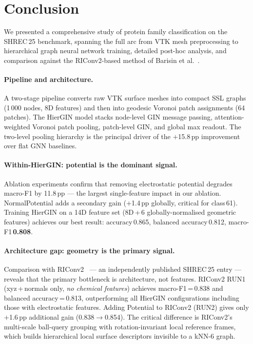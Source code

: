 \section{Conclusion}
\label{sec:conclusion}

We presented a comprehensive study of protein family classification on the
SHREC\,25 benchmark, spanning the full arc from VTK mesh preprocessing to
hierarchical graph neural network training, detailed post-hoc analysis, and
comparison against the RIConv2-based method of Barisin et al.~\cite{riconv2}.

\paragraph{Pipeline and architecture.}
A two-stage pipeline converts raw VTK surface meshes into compact SSL graphs
(1\,000 nodes, 8D features) and then into geodesic Voronoi patch assignments
(64 patches).
The HierGIN model stacks node-level GIN message passing, attention-weighted
Voronoi patch pooling, patch-level GIN, and global max readout.
The two-level pooling hierarchy is the principal driver of the $+$15.8\,pp
improvement over flat GNN baselines.

\paragraph{Within-HierGIN: potential is the dominant signal.}
Ablation experiments confirm that removing electrostatic potential degrades
macro-F1 by 11.8\,pp --- the largest single-feature impact in our ablation.
NormalPotential adds a secondary gain ($+$1.4\,pp globally, critical for
class\,61).
Training HierGIN on a 14D feature set (8D\,+\,6 globally-normalised geometric
features) achieves our best result: accuracy\,0.865, balanced accuracy\,0.812,
macro-F1\,\textbf{0.808}.

\paragraph{Architecture gap: geometry is the primary signal.}
Comparison with RIConv2~\cite{riconv2} --- an independently published SHREC\,25
entry --- reveals that the primary bottleneck is architecture, not features.
RIConv2 RUN1 (xyz\,+\,normals only, \emph{no chemical features}) achieves
macro-F1\,=\,0.838 and balanced accuracy\,=\,0.813, outperforming all
HierGIN configurations including those with electrostatic features.
Adding Potential to RIConv2 (RUN2) gives only $+$1.6\,pp additional gain
(0.838$\to$0.854).
The critical difference is RIConv2's multi-scale ball-query grouping with
rotation-invariant local reference frames, which builds hierarchical local
surface descriptors invisible to a kNN-6 graph.

